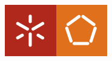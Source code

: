 \begin{titlepage}

\includegraphics[scale=0.7]{img/escola-eng}\\[0cm] %
 

\vfill %

\end{titlepage}
